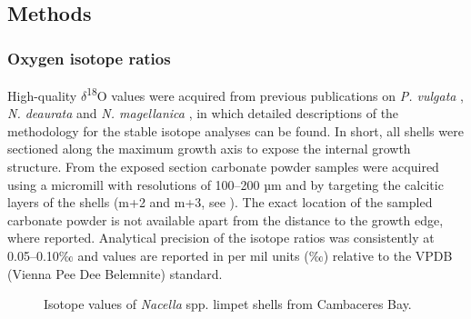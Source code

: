 \documentclass[
  authoryear,
  preprint,
  3p]{elsarticle}
\begin{document}
\subsection{Methods}\label{methods}

\subsubsection{Oxygen isotope ratios}\label{oxygen-isotope-ratios}

High-quality \(\delta\)\textsuperscript{18}O values were acquired from
previous publications on \emph{P. vulgata}
\citep{Surge2012-ba, Graniero2017-io}, \emph{N. deaurata} and \emph{N.
magellanica} \citep{Nicastro2020-ih}, in which detailed descriptions of
the methodology for the stable isotope analyses can be found. In short,
all shells were sectioned along the maximum growth axis to expose the
internal growth structure. From the exposed section carbonate powder
samples were acquired using a micromill with resolutions of 100--200 µm
and by targeting the calcitic layers of the shells (m+2 and m+3, see
\citep{Fenger2007-gf}). The exact location of the sampled carbonate
powder is not available apart from the distance to the growth edge,
where reported. Analytical precision of the isotope ratios was
consistently at 0.05--0.10‰ and values are reported in per mil units (‰)
relative to the VPDB (Vienna Pee Dee Belemnite) standard.

\begin{figure}


\caption{\label{fig-Nac_iso}Isotope values of \emph{Nacella} spp. limpet
shells from Cambaceres Bay.}

\end{figure}%
\end{document}
